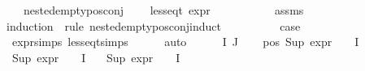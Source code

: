 \begin{isabellebody}
\ \ \ {\isachardoublequoteopen}nested{\isacharunderscore}{\kern0pt}empty{\isacharunderscore}{\kern0pt}pos{\isacharunderscore}{\kern0pt}conj\ {\isasymphi}{\isachardoublequoteclose}\isanewline
\ \ \ {\isachardoublequoteopen}less{\isacharunderscore}{\kern0pt}eq{\isacharunderscore}{\kern0pt}t\ {\isacharparenleft}{\kern0pt}expr\ {\isasymphi}{\isacharparenright}{\kern0pt}\ {\isacharparenleft}{\kern0pt}{}{\isacharcomma}{\kern0pt}\ {\isasyminfinity}{\isacharcomma}{\kern0pt}\ {}{\isacharcomma}{\kern0pt}\ {}{\isacharcomma}{\kern0pt}\ {}{\isacharcomma}{\kern0pt}\ {}{\isacharparenright}{\kern0pt}{\isachardoublequoteclose}\isanewline
%
\isadelimproof
\ \ %
\endisadelimproof
%
\isatagproof
{}\isamarkupfalse%
\ assms\isanewline
{}\isamarkupfalse%
{\isacharparenleft}{\kern0pt}induction\ {\isasymphi}\ rule{\isacharcolon}{\kern0pt}\ nested{\isacharunderscore}{\kern0pt}empty{\isacharunderscore}{\kern0pt}pos{\isacharunderscore}{\kern0pt}conj{\isachardot}{\kern0pt}induct{\isacharparenright}{\kern0pt}\isanewline
\ \ \isamarkupfalse%
\ {}\isanewline
\ \ \isamarkupfalse%
\ \isamarkupfalse%
\ {\isacharquery}{\kern0pt}case\ \isanewline
\ \ \ \ \isamarkupfalse%
\ expr{\isachardot}{\kern0pt}simps\ less{\isacharunderscore}{\kern0pt}eq{\isacharunderscore}{\kern0pt}t{\isachardot}{\kern0pt}simps\isanewline
\ \ \ \ \isamarkupfalse%
\ auto\isanewline
{}\isamarkupfalse%
\isanewline
\ \ \isamarkupfalse%
\ {\isacharparenleft}{\kern0pt}{}\ {\isasymPhi}\ I\ J{\isacharparenright}{\kern0pt}\isanewline
\ \ \isamarkupfalse%
\ pos{\isacharcolon}{\kern0pt}\ {\isachardoublequoteopen}Sup\ {\isacharparenleft}{\kern0pt}{\isacharparenleft}{\kern0pt}expr{\isacharunderscore}{\kern0pt}{}\ {\isasymcirc}\ {\isasymPhi}{\isacharparenright}{\kern0pt}\ {\isacharbackquote}{\kern0pt}\ I{\isacharparenright}{\kern0pt}\ {\isasymle}\ {}{\isachardoublequoteclose}\isanewline
\ {\isachardoublequoteopen}Sup\ {\isacharparenleft}{\kern0pt}{\isacharparenleft}{\kern0pt}expr{\isacharunderscore}{\kern0pt}{}\ {\isasymcirc}\ {\isasymPhi}{\isacharparenright}{\kern0pt}\ {\isacharbackquote}{\kern0pt}\ I{\isacharparenright}{\kern0pt}\ {\isasymle}\ {}{\isachardoublequoteclose}\isanewline
\ {\isachardoublequoteopen}Sup\ {\isacharparenleft}{\kern0pt}{\isacharparenleft}{\kern0pt}expr{\isacharunderscore}{\kern0pt}{}\ {\isasymcirc}\ {\isasymPhi}{\isacharparenright}{\kern0pt}\ {\isacharbackquote}{\kern0pt}\ I{\isacharparenright}{\kern0pt}\ {\isasymle}\ {}{\isachardoublequoteclose}\isanewline

\end{isabellebody}
